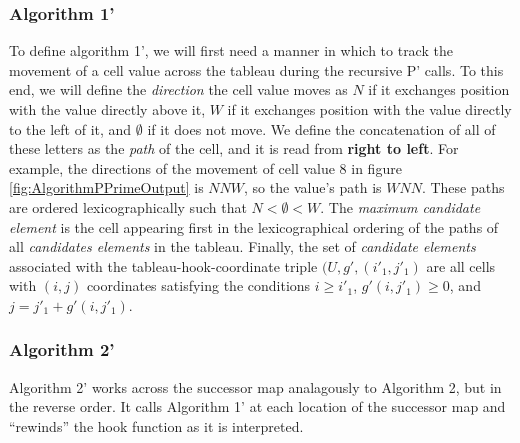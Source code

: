 \documentclass[11pt]{article}
\theoremstyle{definition}
\begin{document}
\subsubsection{Algorithm 1'}
To define algorithm 1', we will first need a manner in which to track the movement of a cell value across the tableau during the recursive P' calls. To this end, we will define the \emph{direction} the cell value moves as $N$ if it exchanges position with the value directly above it, $W$ if it exchanges position with the value directly to the left of it, and $\emptyset$ if it does not move. We define the concatenation of all of these letters as the \emph{path} of the cell, and it is read from \textbf{right to left}.  
For example, the directions of the movement of cell value 8 in figure \ref{fig:AlgorithmPPrimeOutput} is $N N W$, so the value's path is $W N N$. These paths are ordered lexicographically such that $N < \emptyset < W$. The \emph{maximum candidate element} is the cell appearing first in the lexicographical ordering of the paths of all \emph{candidates elements} in the tableau. 
Finally, the set of \emph{candidate elements} associated with the tableau-hook-coordinate triple $(U,g',(i'_1,j'_1)$ are all cells with $(i,j)$ coordinates satisfying the conditions $i \geq i'_1$, $g'(i,j'_1) \ge 0$, and $j = j'_1 + g'(i,j'_1)$.
\begin{algorithm}[H]
\end{algorithm}
\subsubsection{Algorithm 2'}
Algorithm 2' works across the successor map analagously to Algorithm 2, but in the reverse order. It calls Algorithm 1' at each location of the successor map and ``rewinds'' the hook function as it is interpreted. 

\begin{algorithm}[H]
\end{algorithm}
\end{document}
